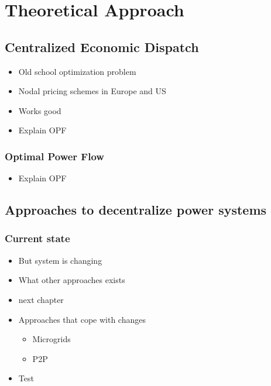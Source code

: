 \section{Theoretical Approach}

\subsection{Centralized Economic Dispatch}

\begin{itemize}
	\item Old school optimization problem
	\item Nodal pricing schemes in Europe and US
	\item Works good
	\item Explain OPF
\end{itemize}

\subsubsection{Optimal Power Flow}

\begin{itemize}
	\item Explain OPF
\end{itemize}

\subsection{Approaches to decentralize power systems}
\label{subsec:decentralization}

\subsubsection{Current state}

\begin{itemize}
	\item But system is changing
	\item What other approaches exists
	\item next chapter	
	\item Approaches that cope with changes
	\begin{itemize}
		\item Microgrids
		\item P2P
	\end{itemize}
	\item Test
\end{itemize}

